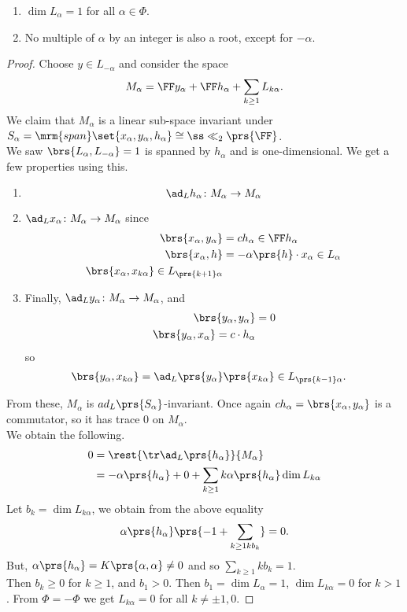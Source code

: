 \documentclass[10pt,a4paper,twoside,openany,hidelinks]{book}
\begin{document}
\begin{proposition}
\begin{enumerate}
\item $\dim L_{\alpha} = 1$ for all $\alpha \in \Phi$.
\item No multiple of $\alpha$ by an integer is also a root, except for $-\alpha$.
\end{enumerate}
\end{proposition}
\begin{proof}
Choose $y \in L_{-\alpha}$ and consider the space \[M_{\alpha} = \FF y_{\alpha} + \FF h_{\alpha} + \sum_{k\geq 1} L_{k\alpha}\text{.}\]
We claim that $M_{\alpha}$ is a linear sub-space invariant under $S_{\alpha} = \mrm{span}\set{x_{\alpha}, y_{\alpha}, h_{\alpha}} \cong \ss\ll_2\prs{\FF}$.\\
We saw $\brs{L_{\alpha},L_{-\alpha}} = 1$ is spanned by $h_{\alpha}$ and is one-dimensional. We get a few properties using this.
\begin{enumerate}[label=(\roman*)]
\item \[\ad_L h_{\alpha} \colon M_{\alpha} \to M_{\alpha}\]
\item $\ad_L x_{\alpha} \colon M_{\alpha} \to M_{\alpha}$
since
\begin{align*}
\brs{x_{\alpha}, y_{\alpha}} &= c h_{\alpha} \in \FF h_{\alpha} \\
\brs{x_{\alpha}, h} &= -\alpha\prs{h} \cdot x_{\alpha} \in L_{\alpha} \\
\brs{x_{\alpha}, x_{k\alpha}} \in L_{\prs{k+1}\alpha}
\end{align*}
\item Finally, $\ad_L y_{\alpha} \colon M_{\alpha} \to M_{\alpha}$, and
\begin{align*}
\brs{y_{\alpha}, y_{\alpha}} &= 0 \\
\brs{y_{\alpha}, x_{\alpha}} = c\cdot h_{\alpha}
\end{align*}
so
\begin{align*}
\brs{y_{\alpha}, x_{k\alpha}} &= \ad_L\prs{y_{\alpha}}\prs{x_{k\alpha}} \in L_{\prs{k-1}\alpha}\text{.}
\end{align*}
\end{enumerate}
From these, $M_{\alpha}$ is $ad_L\prs{S_{\alpha}}$-invariant. Once again $ch_{\alpha} = \brs{x_{\alpha}, y_{\alpha}}$ is a commutator, so it has trace $0$ on $M_{\alpha}$.\\
We obtain the following.
\begin{align*}
0 &= \rest{\tr \ad_L\prs{h_{\alpha}}}{M_{\alpha}} \\&=
-\alpha\prs{h_{\alpha}} + 0 + \sum_{k \geq 1} k\alpha \prs{h_{\alpha}} \dim L_{k\alpha}
\end{align*}
Let $b_k = \dim L_{k\alpha}$, we obtain from the above equality
\[\alpha\prs{h_{\alpha}}\prs{-1 + \sum_{k \geq 1 k b_k}} = 0 \text{.}\]
But, $\alpha\prs{h_{\alpha}} = K\prs{\alpha,\alpha} \neq 0$ and so $\sum_{k \geq 1} k b_k = 1$.\\
Then $b_k \geq 0$ for $k \geq 1$, and $b_1 > 0$.
Then $b_1 = \dim L_{\alpha} = 1$, $\dim L_{k\alpha} = 0$ for $k > 1$.
From $\Phi = -\Phi$ we get $L_{k\alpha} = 0$ for all $k \neq \pm 1,0$.
\end{proof}
\end{document}
